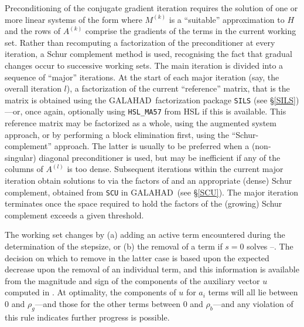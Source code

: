 \documentclass[twoside]{article}
\newcommand{\gal}{{\sf GALAHAD}}
\begin{document}
Preconditioning of the conjugate gradient iteration
requires the solution of one or more linear systems of the form
where $M^{(k)}$ is a ``suitable'' approximation to $H$
and the rows of $A^{(k)}$ comprise the gradients of the
terms in the current working set. Rather than recomputing a
factorization of the preconditioner at every iteration, a
Schur complement method is used, recognising the fact that
gradual changes occur to successive working sets. The main
iteration is divided into a sequence of ``major'' iterations.
At the start of each major iteration (say, the overall iteration $l$), 
a factorization of the
current ``reference'' matrix, that is the matrix
is obtained using  the \gal\ factorization package
{\tt SILS} (see \S\ref{SILS})---or, once again, 
optionally using {\tt HSL\_MA57} from HSL if this is available.
This reference matrix may be factorized as a whole, using the
augmented system approach, or by performing a block elimination first, using 
the ``Schur-complement'' approach. The latter is usually to be preferred 
when a (non-singular) diagonal 
preconditioner is used, but may be inefficient if any of the columns
of $A^{(l)}$ is too dense.
Subsequent iterations within the current major
iteration obtain solutions to  via the factors of 
and an appropriate (dense) Schur complement,
obtained from {\tt SCU} in \gal\ (see \S\ref{SCU}).
The major iteration terminates
once the space required to hold the factors of the (growing) Schur
complement exceeds a given threshold.

The working set changes by (a) adding an active term encountered during 
the determination of the stepsize, or (b) the removal of a term if $s = 0$
solves --. The  decision on which to remove in the latter 
case is based upon the expected decrease upon the removal of an individual term,
and this information is available from the magnitude and sign of the components
of the auxiliary vector $u$ computed in . At optimality, the
components of $u$ for $a_i$ terms will all lie between 
$0$ and $\rho_g$---and those for the other terms 
between $0$ and $\rho_b$---and any violation
of this rule indicates further progress is possible. 
\end{document}
